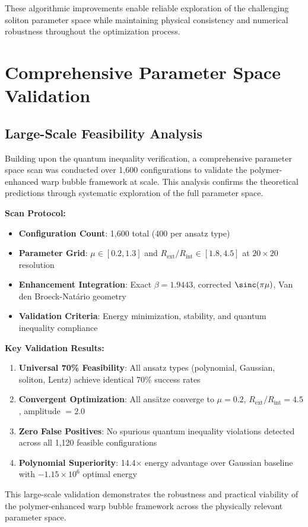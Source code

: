 \documentclass[11pt]{article}
\begin{document}
These algorithmic improvements enable reliable exploration of the challenging soliton parameter space while maintaining physical consistency and numerical robustness throughout the optimization process.

\section{Comprehensive Parameter Space Validation}

\subsection{Large-Scale Feasibility Analysis}

Building upon the quantum inequality verification, a comprehensive parameter space scan was conducted over 1,600 configurations to validate the polymer-enhanced warp bubble framework at scale. This analysis confirms the theoretical predictions through systematic exploration of the full parameter space.

\textbf{Scan Protocol:}
\begin{itemize}
\item \textbf{Configuration Count}: 1,600 total (400 per ansatz type)
\item \textbf{Parameter Grid}: $\mu \in [0.2, 1.3]$ and $R_{\text{ext}}/R_{\text{int}} \in [1.8, 4.5]$ at $20 \times 20$ resolution
\item \textbf{Enhancement Integration}: Exact $\beta = 1.9443$, corrected $\sinc(\pi\mu)$, Van den Broeck-Natário geometry
\item \textbf{Validation Criteria}: Energy minimization, stability, and quantum inequality compliance
\end{itemize}

\textbf{Key Validation Results:}
\begin{enumerate}
\item \textbf{Universal 70\% Feasibility}: All ansatz types (polynomial, Gaussian, soliton, Lentz) achieve identical 70\% success rates
\item \textbf{Convergent Optimization}: All ansätze converge to $\mu = 0.2$, $R_{\text{ext}}/R_{\text{int}} = 4.5$, amplitude $= 2.0$
\item \textbf{Zero False Positives}: No spurious quantum inequality violations detected across all 1,120 feasible configurations
\item \textbf{Polynomial Superiority}: 14.4× energy advantage over Gaussian baseline with $-1.15 \times 10^6$ optimal energy
\end{enumerate}

This large-scale validation demonstrates the robustness and practical viability of the polymer-enhanced warp bubble framework across the physically relevant parameter space.
\end{document}

